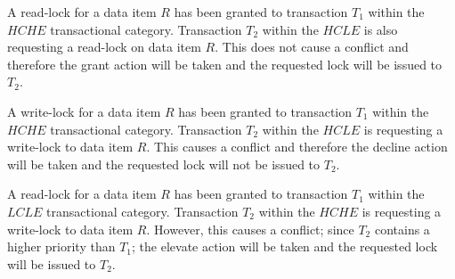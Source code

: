 \begin{definition}
 \begin{example}
 \label{ex_grant_action}
  A read-lock for a data item $R$ has been granted to transaction $T_{1}$ within the $HCHE$ transactional category. Transaction $T_{2}$ within the $HCLE$ is also requesting a read-lock on data item $R$. This does not cause a conflict and therefore the grant action will be taken and the requested lock will be issued to $T_{2}$.
 \end{example}
 

 
 \begin{example}
 \label{ex_decline_action}
  A write-lock for a data item $R$ has been granted to transaction $T_{1}$ within the $HCHE$ transactional category. Transaction $T_{2}$ within the $HCLE$ is requesting a write-lock to data item $R$. This causes a conflict and therefore the decline action will be taken and the requested lock will not be issued to $T_{2}$.
 \end{example}
 

 
 \begin{example}
 \label{ex_elevate_action}
  A read-lock for a data item $R$ has been granted to transaction $T_{1}$ within the $LCLE$ transactional category. Transaction $T_{2}$ within the $HCHE$ is requesting a write-lock to data item $R$. However, this causes a conflict; since $T_{2}$ contains a higher priority than $T_{1}$; the elevate action will be taken and the requested lock will be issued to $T_{2}$.
 \end{example}
 
\end{definition}
